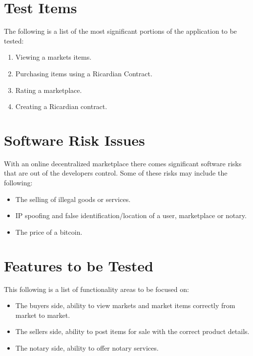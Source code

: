 \documentclass{article}
\begin{document}
\section*{Test Items}
The following is a list of the most significant portions of the application to be tested:
\newline
\begin{enumerate}
 \item
Viewing a markets items.
 \item
Purchasing items using a Ricardian Contract.
 \item
Rating a marketplace.
\item
Creating a Ricardian contract.
\end{enumerate}

\section*{Software Risk Issues}
With an online decentralized marketplace there comes significant software risks that are out of the developers control.
Some of these risks may include the following:
\newline
\begin{itemize}
 \item
The selling of illegal goods or services.
 \item
IP spoofing and false identification/location of a user, marketplace or notary.
 \item
The price of a bitcoin.
\end{itemize}

\section*{Features to be Tested}
This following is a list of functionality areas to be focused on:
\newline
\begin{itemize}
 \item
The buyers side, ability to view markets and market items correctly from market to market.
 \item
The sellers side, ability to post items for sale with the correct product details.
 \item
The notary side, ability to offer notary services.
\end{itemize}
\end{document}
